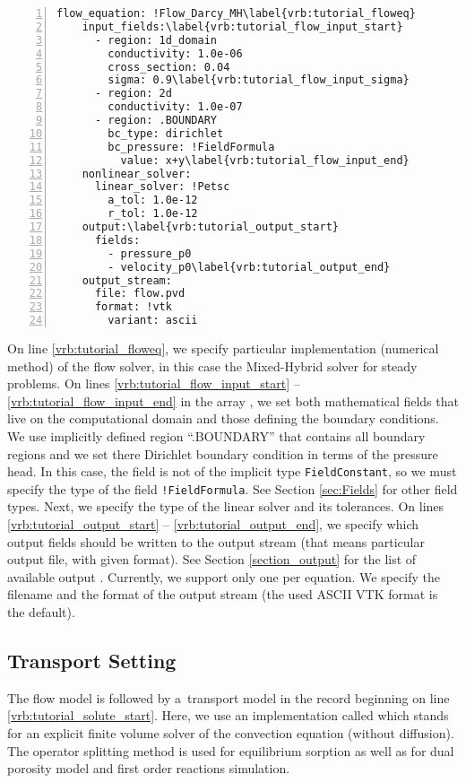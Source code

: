 \begin{Verbatim}[numbers=left, firstnumber=last,commandchars=\\\{\}]
  flow_equation: !Flow_Darcy_MH\label{vrb:tutorial_floweq}
    input_fields:\label{vrb:tutorial_flow_input_start}
      - region: 1d_domain
        conductivity: 1.0e-06
        cross_section: 0.04
        sigma: 0.9\label{vrb:tutorial_flow_input_sigma}
      - region: 2d
        conductivity: 1.0e-07
      - region: .BOUNDARY
        bc_type: dirichlet
        bc_pressure: !FieldFormula
          value: x+y\label{vrb:tutorial_flow_input_end}
    nonlinear_solver:
      linear_solver: !Petsc
        a_tol: 1.0e-12
        r_tol: 1.0e-12
    output:\label{vrb:tutorial_output_start}
      fields:
        - pressure_p0
        - velocity_p0\label{vrb:tutorial_output_end}
    output_stream:
      file: flow.pvd
      format: !vtk
        variant: ascii
\end{Verbatim}
%
On line \ref{vrb:tutorial_floweq}, we specify particular implementation (numerical method) of the flow solver, in this case the Mixed-Hybrid
solver for steady problems. On lines \ref{vrb:tutorial_flow_input_start} -- \ref{vrb:tutorial_flow_input_end} in the array , 
we set both mathematical fields that live on the computational domain 
and those defining the boundary conditions.
We use implicitly defined region ``.BOUNDARY'' that contains all boundary regions and we set there Dirichlet boundary condition in terms of the 
pressure head. In this case, the field is not of the implicit type {\tt FieldConstant}, so we must specify the type of the field {\tt !FieldFormula}.
See Section \ref{sec:Fields} for other field types. 
Next, we specify the type of the linear solver and its tolerances.
On lines \ref{vrb:tutorial_output_start} -- \ref{vrb:tutorial_output_end}, we specify which output fields should be written to the output stream
(that means particular output file, with given format). See Section \ref{section_output} for the list of available output .
Currently, we support only one  per equation. We specify the filename and the format of the output stream (the used ASCII VTK format is the default).



\subsection{Transport Setting}
The flow model is followed by a~transport model in the record 
beginning on line \ref{vrb:tutorial_solute_start}. Here, we use an implementation called 
which stands for an explicit finite volume solver of the convection equation (without diffusion).
The operator splitting method is used for equilibrium sorption as well as for dual porosity model and 
first order reactions simulation.

